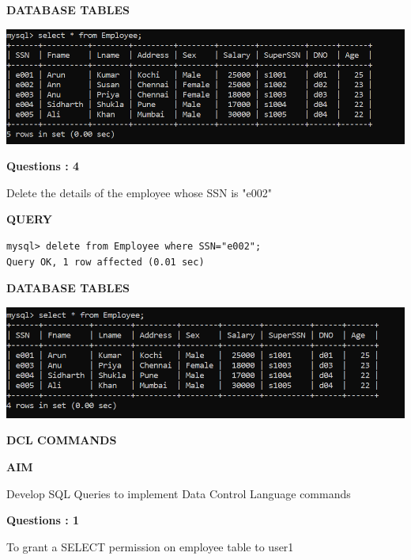\documentclass[a4paper,12pt]{report}
\begin{document}
\begin{flushleft}
		\textbf{DATABASE TABLES} 
\end{flushleft} 

\includegraphics[scale=0.75]{updempsalary.png}

\begin{flushleft}
    \textbf{Questions : 4}
\end{flushleft}
Delete the details of the employee whose SSN is "e002"
\begin{flushleft}
		\textbf{QUERY }
	\end{flushleft}
\begin{verbatim}
mysql> delete from Employee where SSN="e002";
Query OK, 1 row affected (0.01 sec)
\end{verbatim}


\begin{flushleft}
		\textbf{DATABASE TABLES} 
\end{flushleft} 

\includegraphics[scale=1]{delemp.png}
\newpage
\begin{center}
		\large\textbf{DCL COMMANDS}
	\end{center}
	
	\begin{flushleft}
		\textbf{AIM }
	\end{flushleft} 
	   Develop SQL Queries to implement Data Control Language commands
\begin{flushleft}
    \textbf{Questions : 1}
\end{flushleft}
 To grant a SELECT permission on employee table to user1
	
\end{document}
